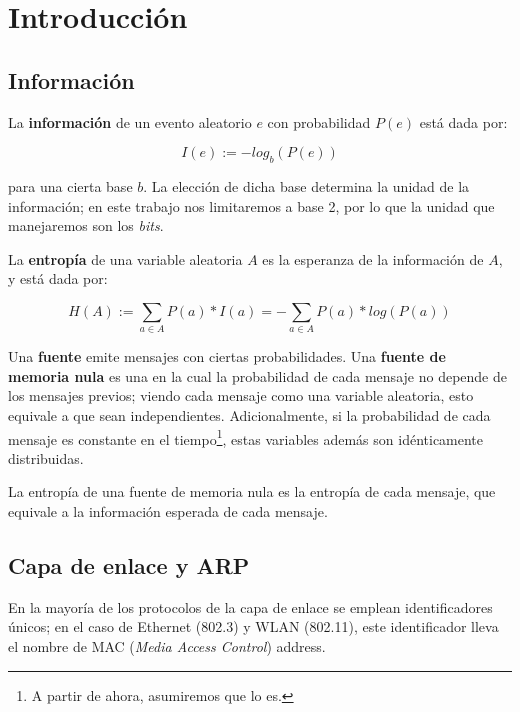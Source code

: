\section{Introducci\'on}

\subsection{Información}

\par La \textbf{información} de un evento aleatorio $e$ con probabilidad $P(e)$ está dada por:

\begin{equation*}
    I(e) := -log_b(P(e))
\end{equation*}

para una cierta base $b$. 
La elección de dicha base determina la unidad de la información; en este trabajo nos limitaremos a base 2, por lo que la unidad que manejaremos son los \textit{bits}. 

\par La \textbf{entropía} de una variable aleatoria $A$ es la esperanza de la información de $A$, y está dada por:

\begin{equation*}
    H(A) := \sum_{a \in A}{P(a) * I(a)} = - \sum_{a \in A}{P(a) * log(P(a))}
\end{equation*}

\par Una \textbf{fuente} emite mensajes con ciertas probabilidades.
Una \textbf{fuente de memoria nula} es una en la cual la probabilidad de cada mensaje no depende de los mensajes previos; viendo cada mensaje como una variable aleatoria, esto equivale a que sean independientes.
Adicionalmente, si la probabilidad de cada mensaje es constante en el tiempo\footnote{A partir de ahora, asumiremos que lo es.}, estas variables además son idénticamente distribuidas.

\par La entropía de una fuente de memoria nula es la entropía de cada mensaje, que equivale a la información esperada de cada mensaje.

\subsection{Capa de enlace y ARP}

\par En la mayoría de los protocolos de la capa de enlace se emplean identificadores únicos; en el caso de Ethernet (802.3) y WLAN (802.11), este identificador lleva el nombre de MAC (\textit{Media Access Control}) address.

